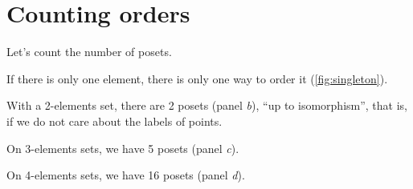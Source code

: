 \section{Counting orders}


Let's count the number of posets.

If there is only one element, there is only one way to order it (\cref{fig:singleton}).

With a 2-elements set, there are 2 posets (panel \emph{b}), ``up to isomorphism'',
that is, if we do not care about the labels of points.

On 3-elements sets, we have 5 posets (panel \emph{c}).

On 4-elements sets, we have 16 posets (panel \emph{d}).

\vfill

